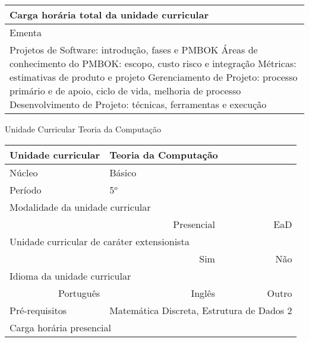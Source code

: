 \begin{quadro}[h!]
\begin{tabular}{|p{3cm} p{2cm} p{3cm} p{2cm} p{3cm} p{2cm}|}
\multicolumn{5}{|p{13cm}|}{\cellcolor{blue1} Carga horária total da unidade curricular} & \multicolumn{1}{p{1cm}|}{\raggedleft 60	}\\\hline
\multicolumn{6}{|p{15cm}|}{\cellcolor{blue1} Ementa} \\\hline
\hline\multicolumn{6}{|p{15cm}|}{\scriptsize Projetos de Software: introdução, fases e PMBOK Áreas de conhecimento do PMBOK: escopo, custo risco e integração Métricas: estimativas de produto e projeto Gerenciamento de Projeto: processo primário e de apoio, ciclo de vida, melhoria de processo Desenvolvimento de Projeto: técnicas, ferramentas e execução}\\\hline
\hline
	\end{tabular}
\end{quadro}
\begin{quadro}[h!]
  \centering\scriptsize
\caption{Unidade Curricular Teoria da Computação}
\label{ unit_26 }
\begin{tabular}{|p{3cm} p{2cm} p{3cm} p{2cm} p{3cm} p{2cm}|}\hline
\multicolumn{1}{|p{3cm}|}{\cellcolor{blue1} Unidade curricular} & \multicolumn{5}{p{9cm}|}{ Teoria da Computação }\\\hline
\multicolumn{1}{|p{3cm}|}{\cellcolor{blue1} Núcleo} & \multicolumn{5}{p{11.5cm}|}{ Básico }\\\hline
\multicolumn{1}{|p{3cm}|}{\cellcolor{blue1} Período} & \multicolumn{5}{p{9cm}|}{ 5$^o$ }\\\hline
\multicolumn{6}{|p{15cm}|}{\cellcolor{blue1} Modalidade da unidade curricular} \\\hline
\multicolumn{2}{|r}{		} &  \multicolumn{2}{r}{Presencial \XBox } & \multicolumn{2}{r|}{EaD \Square	} \\\hline
\multicolumn{6}{|p{15cm}|}{\cellcolor{blue1} Unidade curricular de caráter extensionista} \\\hline
\multicolumn{4}{|r}{			Sim \Square	} & \multicolumn{2}{r|}{	Não \XBox	}\\\hline
\multicolumn{6}{|p{15cm}|}{\cellcolor{blue1} Idioma da unidade curricular} \\ \hline
\multicolumn{2}{|r}{	Português \XBox	} &  \multicolumn{2}{r}{	Inglês \Square	} & \multicolumn{2}{r|}{	Outro \Square	} \\ \hline
\multicolumn{1}{|p{3cm}|}{\cellcolor{blue1} Pré-requisitos} & \multicolumn{5}{p{9cm}|}{ Matemática Discreta, Estrutura de Dados 2 }\\ \hline
\multicolumn{6}{|p{15cm}|}{\cellcolor{blue1} Carga horária presencial} \\ \hline

\end{tabular}
\end{quadro}

